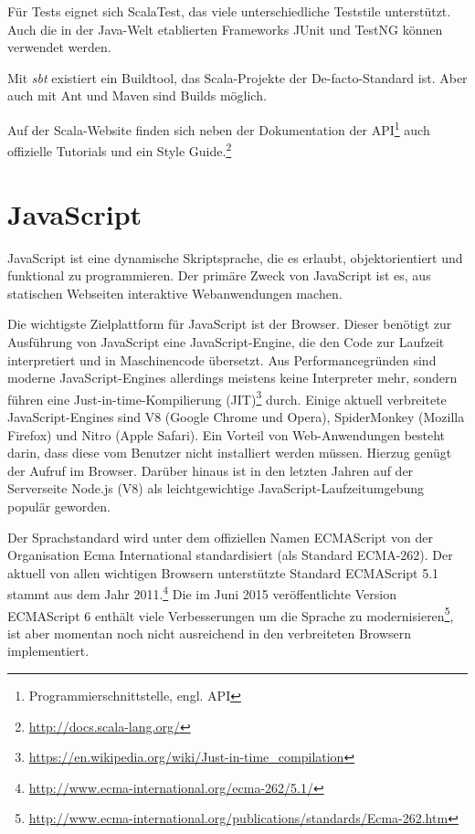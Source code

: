 \documentclass[a4paper, 12pt, hidelinks, listof=totoc, listoftables=totoc, bibliography=totoc]{scrreprt}
\begin{document}
Für Tests eignet sich ScalaTest, das viele unterschiedliche Teststile unterstützt. Auch die in der Java-Welt etablierten Frameworks JUnit und TestNG können verwendet werden.

Mit \emph{sbt} existiert ein Buildtool, das Scala-Projekte der De-facto-Standard ist. Aber auch mit Ant und Maven sind Builds möglich.

Auf der Scala-Website finden sich neben der Dokumentation der API\footnote{Programmierschnittstelle, engl. \ac{API}} auch offizielle Tutorials und ein Style Guide.\footnote{\url{http://docs.scala-lang.org/}}



\section{JavaScript}

JavaScript ist eine dynamische Skriptsprache, die es erlaubt, objektorientiert und funktional zu programmieren. Der primäre Zweck von JavaScript ist es, aus statischen Webseiten interaktive Webanwendungen machen\cite[S. 361]{flanagan2011.JDG}.

Die wichtigste Zielplattform für JavaScript ist der Browser. Dieser benötigt zur Ausführung von JavaScript eine JavaScript-Engine, die den Code zur Laufzeit interpretiert und in Maschinencode übersetzt. Aus Performancegründen sind moderne JavaScript-Engines allerdings meistens keine Interpreter mehr, sondern führen eine Just-in-time-Kompilierung (JIT)\footnote{\url{https://en.wikipedia.org/wiki/Just-in-time_compilation}} durch. Einige aktuell verbreitete JavaScript-Engines sind V8 (Google Chrome und Opera), SpiderMonkey (Mozilla Firefox) und Nitro (Apple Safari). Ein Vorteil von Web-Anwendungen besteht darin, dass diese vom Benutzer nicht installiert werden müssen. Hierzug genügt der Aufruf im Browser. Darüber hinaus ist in den letzten Jahren auf der Serverseite Node.js (V8) als leichtgewichtige JavaScript-Laufzeitumgebung populär geworden.

Der Sprachstandard wird unter dem offiziellen Namen ECMAScript von der Organisation Ecma International standardisiert (als Standard ECMA-262). Der aktuell von allen wichtigen Browsern unterstützte Standard ECMAScript 5.1 stammt aus dem Jahr 2011.\footnote{\url{http://www.ecma-international.org/ecma-262/5.1/}} Die im Juni 2015 veröffentlichte Version ECMAScript 6 enthält viele Verbesserungen um die Sprache zu modernisieren\footnote{\url{http://www.ecma-international.org/publications/standards/Ecma-262.htm}}, ist aber momentan noch nicht ausreichend in den verbreiteten Browsern implementiert.
\end{document}
